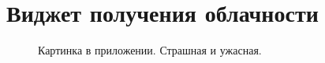 \chapter{Виджет получения облачности}
\label{cha:cloud}

\begin{figure}
	\centering
	\caption{Картинка в приложении. Страшная и ужасная.}
\end{figure}